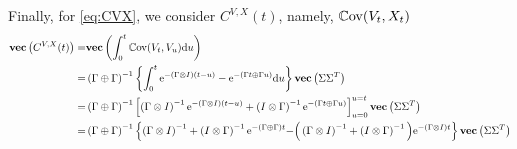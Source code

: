 Finally, for \eqref{eq:CVX}, we consider $C^{V,X}(t)$, namely, $\Cov (V_t, X_t)$
\begin{align*}
\Vect{C^{V,X}(t)} =& \Vect{\int_0^t  \Cov(V_t, V_u) \rmd u}\\
=&\GpG\inv  \left\lbrace\int_0^t  \e^{-\GoI(t-u)} - \e^{-\left(\Gamma t \oplus \Gamma u \right)}\rmd u \right\rbrace \Vect{\Sigma\Sigma^T}\\
=& \GpG\inv  \left[\GoI\inv \e^{-\GoI(t-u)} + \IoG\inv \e^{-\left(\Gamma t \oplus \Gamma u \right)} \right]_{u=0}^{u=t} \Vect{\Sigma\Sigma^T} \\
=& \GpG\inv  \left\lbrace \GoI\inv + \IoG\inv \e^{- \GpG t} - \right( \GoI\inv + \IoG\inv \left)\e^{-\GoI t}\right\rbrace \Vect{\Sigma\Sigma^T}
\end{align*}

